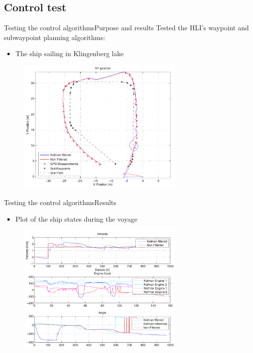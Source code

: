 
	\subsection{Control test}
	\begin{frame}{Testing the control algorithms}{Purpose and results}
		Tested the HLI's waypoint and subwaypoint planning algorithms:
		\begin{itemize}
		\item The ship sailing in Klingenberg lake
		\end{itemize}
		\begin{figure}
			\begin{center}
				\includegraphics[width=8.2cm]{img/position}
				\label{fig:controltest1}
			\end{center}
		\end{figure}
	\end{frame}


	\begin{frame}{Testing the control algorithms}{Results}
		\begin{itemize}
		\item Plot of the ship states during the voyage
		\end{itemize}
		\begin{figure}
			\begin{center}
				\includegraphics[width=8.2cm]{img/states}
				\label{fig:controltest3}
			\end{center}
		\end{figure}
	\end{frame}

